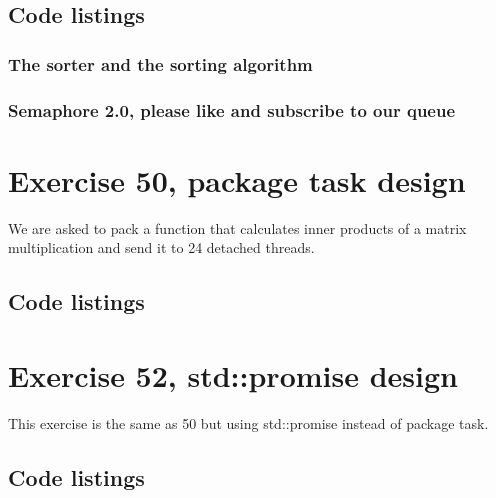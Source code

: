 \documentclass[11pt]{article}
\begin{document}
\subsection*{Code listings}




\subsubsection*{The sorter and the sorting algorithm}



\subsubsection*{Semaphore 2.0, please like and subscribe to our queue}











\section*{Exercise 50, package task design}
We are asked to pack a function that calculates inner products of a matrix multiplication and send it to 24 detached threads.

\subsection*{Code listings}



\section*{Exercise 52, std::promise design}
This exercise is the same as 50 but using std::promise instead of package task.

\subsection*{Code listings}

\end{document}
